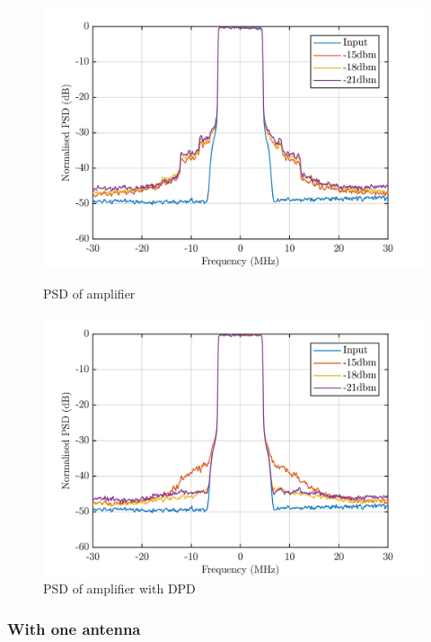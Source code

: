 \begin{figure}[H]
  \centering
  \begin{minipage}[b]{0.5\textwidth}
	\includegraphics[scale = 0.5]{figures/measurement/cree/psd_cree_amp_no_dpd.png}
	\caption{PSD of amplifier}
    \label{fig:cree_amam1}
  \end{minipage}
  \hfill
  \begin{minipage}[b]{0.4\textwidth}
\includegraphics[scale = 0.5]{figures/measurement/cree/psd_cree_amp_with_dpd.png}
\caption{PSD of amplifier with DPD}
    \label{fig:cree_amam2}
  \end{minipage}
\end{figure}

\subsubsection{With one antenna}



